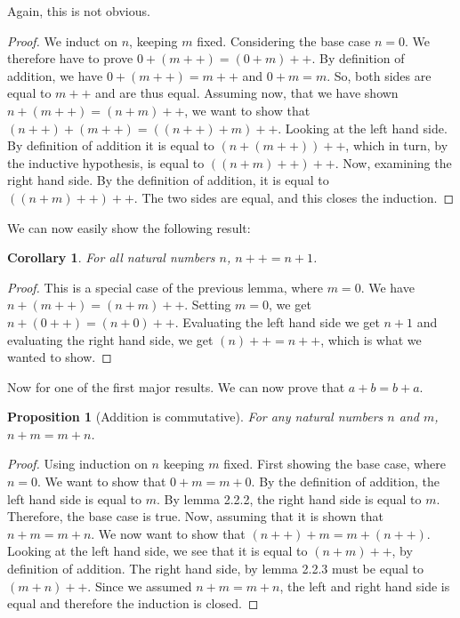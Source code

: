 \documentclass[a4paper, twocolumn]{report}
\newcounter{dummy} \numberwithin{dummy}{section}
\newtheorem{prp}[dummy]{Proposition}
\newtheorem*{crl*}{Corollary}
\newcommand{\dplus}{{+}{+}}
\begin{document}
Again, this is not obvious. 

\begin{proof}
  We induct on $n$, keeping $m$ fixed. Considering the base case $n = 0$. We
  therefore have to prove $ 0 + (m\dplus) = (0 + m)\dplus$. By definition of
  addition, we have $0 + (m\dplus) = m\dplus$ and $0 + m = m$. So, both sides
  are equal to $m\dplus$ and are thus equal. Assuming now, that we have shown
  $n + (m\dplus) = (n + m)\dplus$, we want to show that $(n\dplus) + (m\dplus)
  = \left( \left( n\dplus \right) + m \right)\dplus$.  Looking at the left hand
  side. By definition of addition it is equal to $\left( n + \left( m\dplus
  \right) \right)\dplus$, which in turn, by the inductive hypothesis, is equal
  to $\left(\left( n + m \right)\dplus\right)\dplus$. Now, examining the right
  hand side. By the definition of addition, it is equal to $\left(\left( n + m
  \right)\dplus\right)\dplus$. The two sides are equal, and this closes the
  induction.
\end{proof}
We can now easily show the following result:
\begin{crl*}
  For all natural numbers $n$, $n\dplus = n + 1$.    
\end{crl*}
\begin{proof}
  This is a special case of the previous lemma, where $m = 0$.  We have $n +
  (m\dplus) = (n + m)\dplus$. Setting $m = 0$, we get $n + (0\dplus) = (n +
  0)\dplus$. Evaluating the left hand side we get $n + 1$ and evaluating the
  right hand side, we get $(n)\dplus = n\dplus$, which is what we wanted to
  show.
\end{proof}

Now for one of the first major results. We can now prove that $a + b = b + a$.

\begin{prp}[Addition is commutative]
  For any natural numbers $n$ and $m$, $n + m = m + n$. 
\end{prp}
\begin{proof}
  Using induction on $n$ keeping $m$ fixed.  First showing the base case, where
  $n = 0$.  We want to show that $0 + m = m + 0$.  By the definition of
  addition, the left hand side is equal to $m$. By lemma 2.2.2, the right hand
  side is equal to $m$. Therefore, the base case is true.  Now, assuming that
  it is shown that $n + m = m + n$.  We now want to show that $(n\dplus) + m =
  m + (n\dplus)$.  Looking at the left hand side, we see that it is equal to
  $(n + m)\dplus$, by definition of addition.  The right hand side, by lemma
  2.2.3 must be equal to $(m + n)\dplus$. Since we assumed $n + m = m + n$, the
  left and right hand side is equal and therefore the induction is closed.
\end{proof}
\end{document}
